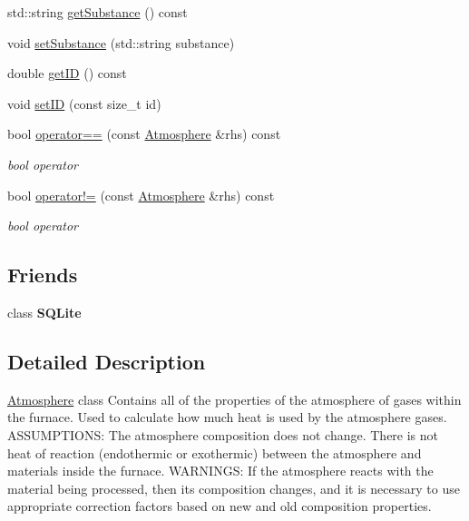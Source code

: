 \begin{DoxyCompactItemize}
\item 
std\+::string \hyperlink{class_atmosphere_a3ac0fb0d4fc92edc690e44b40b7018c2}{get\+Substance} () const
\item 
void \hyperlink{class_atmosphere_aa92f55a1f07304f3e57fdfb8ece65d82}{set\+Substance} (std\+::string substance)
\item 
double \hyperlink{class_atmosphere_a4dfda799563c28438db1b23cbee6e099}{get\+ID} () const
\item 
void \hyperlink{class_atmosphere_a156e09f05336057be5591146948f6046}{set\+ID} (const size\+\_\+t id)
\item 
\mbox{\label{class_atmosphere_a6bddf411a91af4808f52cd69033a5c54}} 
bool \hyperlink{class_atmosphere_a6bddf411a91af4808f52cd69033a5c54}{operator==} (const \hyperlink{class_atmosphere}{Atmosphere} \&rhs) const
\begin{DoxyCompactList}\small\item\em bool operator \end{DoxyCompactList}\item 
\mbox{\label{class_atmosphere_a8f75154e49eb74561dc9053607f502f9}} 
bool \hyperlink{class_atmosphere_a8f75154e49eb74561dc9053607f502f9}{operator!=} (const \hyperlink{class_atmosphere}{Atmosphere} \&rhs) const
\begin{DoxyCompactList}\small\item\em bool operator \end{DoxyCompactList}\end{DoxyCompactItemize}
\subsection*{Friends}
\begin{DoxyCompactItemize}
\item 
\mbox{\label{class_atmosphere_ac7d22f3ca36435f73d55df60dc799e14}} 
class {\bfseries S\+Q\+Lite}
\end{DoxyCompactItemize}


\subsection{Detailed Description}
\hyperlink{class_atmosphere}{Atmosphere} class Contains all of the properties of the atmosphere of gases within the furnace. Used to calculate how much heat is used by the atmosphere gases. A\+S\+S\+U\+M\+P\+T\+I\+O\+NS\+: The atmosphere composition does not change. There is not heat of reaction (endothermic or exothermic) between the atmosphere and materials inside the furnace. W\+A\+R\+N\+I\+N\+GS\+: If the atmosphere reacts with the material being processed, then its composition changes, and it is necessary to use appropriate correction factors based on new and old composition properties. 

